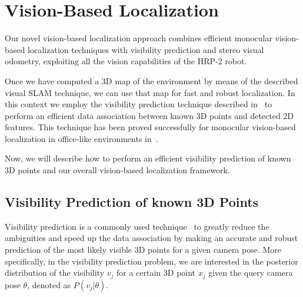\section{Vision-Based Localization}\label{sec:localization}
Our novel vision-based localization approach combines efficient
monocular vision-based localization techniques with visibility
prediction and stereo visual odometry, exploiting all the vision
capabilities of the HRP-2 robot.

Once we have computed a 3D map of the environment by means of the
described visual SLAM technique, we can use that map for fast and
robust localization. In this context we employ the visibility
prediction technique described in~\cite{Alcantarilla11icra} to perform
an efficient data association between known 3D points and detected 2D
features. This technique has been proved successfully for monocular
vision-based localization in office-like environments
in~\cite{Alcantarilla10icra}.

Now, we will describe how to perform an efficient visibility
prediction of known 3D points and our overall vision-based
localization framework.

\subsection{Visibility Prediction of known 3D Points}\label{sec:visibility}
Visibility prediction is a commonly used
technique~\cite{Alcantarilla11icra} to greatly reduce the ambiguities
and speed up the data association by making an accurate and robust
prediction of the most likely visible 3D points for a given camera
pose. More specifically, in the visibility prediction problem, we are
interested in the posterior distribution of the visibility $v_{j}$ for
a certain 3D point $x_{j}$ given the query camera pose $\theta$,
denoted as $P(v_{j} \vert \theta)$.


